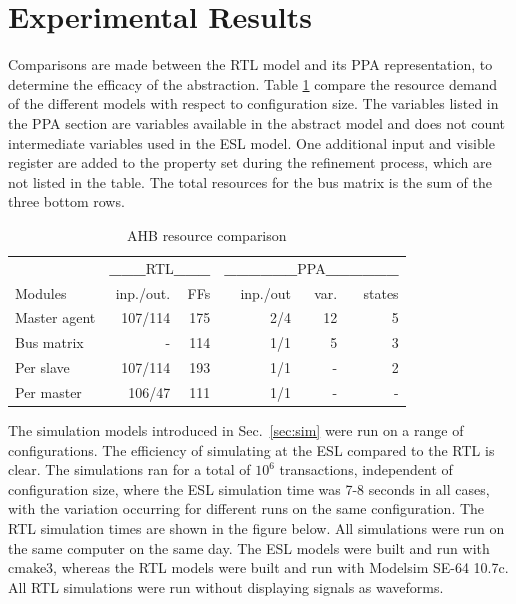 \section{Experimental Results}
Comparisons are made between the RTL model and its PPA representation, to determine the efficacy of the abstraction. Table \ref{tab:stats} compare the resource demand of the different models with respect to configuration size. The variables listed in the PPA section are variables available in the abstract model and does not count intermediate variables used in the ESL model. One additional input and visible register are added to the property set during the refinement process, which are not listed in the table. The total resources for the bus matrix is the sum of the three bottom rows.

\begin{table}[hbt] 
  \begin{tabular}{ l r r r r r}
  \hline 
  \hline
      & \multicolumn{2}{c}{\textbf{\_\_\_}RTL\textbf{\_\_\_}} & \multicolumn{3}{c}{\textbf{\_\_\_\_\_\_}PPA\textbf{\_\_\_\_\_\_}} \\
  Modules & inp./out. & FFs & inp./out & var. & states \\
    \hline
  Master agent & 107/114 & 175 & 2/4 & 12 & 5 \\
  \hline
  Bus matrix & - & 114 & 1/1 & 5 & 3 \\
  
  Per slave & 107/114 & 193 & 1/1 & - & 2 \\
 
  Per master & 106/47 & 111 & 1/1 & - & - \\
    \hline
    \hline  
  \end{tabular}
\caption{AHB resource comparison}
\label{tab:stats}
\end{table}

The simulation models introduced in Sec.~\ref{sec:sim} were run on a range of configurations. The efficiency of simulating at the ESL compared to the RTL is clear. The simulations ran for a total of $10^6$ transactions, independent of configuration size, where the ESL simulation time was 7-8 seconds in all cases, with the variation occurring for different runs on the same configuration. The RTL simulation times are shown in the figure below. All simulations were run on the same computer on the same day. The ESL models were built and run with cmake3, whereas the RTL models were built and run with Modelsim SE-64 10.7c. All RTL simulations were run without displaying signals as waveforms. \\

